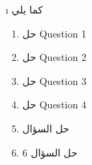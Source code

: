 \begin {corrige}[\thechapter ]{\i }
 كما يلي
\begin{enumerate}
\item حل Question 1
\item حل Question 2
\item حل Question 3
\item حل Question 4
\item حل السؤال  
\item حل السؤال 6
\end{enumerate}
\end {corrige}\par \vspace *{\spacebeforeexo }
